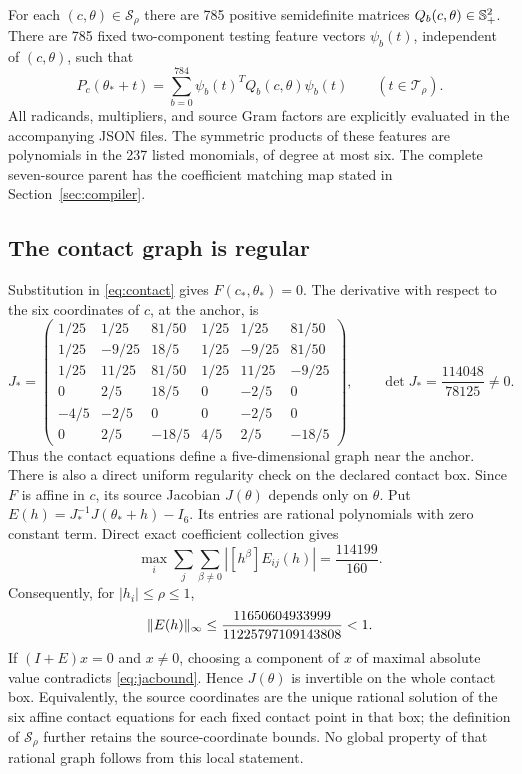 \begin{theorem}\label{thm:main}
For each $(c,\theta)\in\mathcal S_\rho$ there are 785 positive semidefinite
matrices $Q_b(c,\theta)\in\mathbb S_+^2$. There are 785 fixed two-component testing
feature vectors $\psi_b(t)$, independent of $(c,\theta)$, such that
\begin{equation}
 P_c(\theta_*+t)=\sum_{b=0}^{784}\psi_b(t)^TQ_b(c,\theta)\psi_b(t)
 \qquad(t\in\mathcal T_\rho).
 \label{eq:main}
\end{equation}
All radicands, multipliers, and source Gram factors are explicitly evaluated in
the accompanying JSON files. The symmetric products of these features are
polynomials in the 237 listed monomials, of degree at most six. The complete
seven-source parent has the coefficient matching map stated in
Section~\ref{sec:compiler}.
\end{theorem}

\subsection{The contact graph is regular}

Substitution in \eqref{eq:contact} gives $F(c_*,\theta_*)=0$. The derivative
with respect to the six coordinates of $c$, at the anchor, is
\begin{equation}
 J_*=
 \begin{pmatrix}
 1/25&1/25&81/50&1/25&1/25&81/50\\
 1/25&-9/25&18/5&1/25&-9/25&81/50\\
 1/25&11/25&81/50&1/25&11/25&-9/25\\
 0&2/5&18/5&0&-2/5&0\\
 -4/5&-2/5&0&0&-2/5&0\\
 0&2/5&-18/5&4/5&2/5&-18/5
 \end{pmatrix},\qquad
 \det J_*=\frac{114048}{78125}\ne0.
 \label{eq:jacobian}
\end{equation}
Thus the contact equations define a five-dimensional graph near the anchor.
There is also a direct uniform regularity check on the declared contact box.
Since $F$ is affine in $c$, its source Jacobian $J(\theta)$ depends only on
$\theta$. Put $E(h)=J_*^{-1}J(\theta_*+h)-I_6$. Its entries are rational
polynomials with zero constant term. Direct exact coefficient collection gives
\begin{equation}
 \max_i\sum_j\sum_{\beta\ne0}|[h^\beta]E_{ij}(h)|
   =\frac{114199}{160}.
 \label{eq:jacnorm}
\end{equation}
Consequently, for $|h_i|\leq\rho\leq1$,
\begin{equation}
 \lVert E(h)\rVert_\infty\leq
 \frac{11650604933999}{11225797109143808}<1.
 \label{eq:jacbound}
\end{equation}
If $(I+E)x=0$ and $x\ne0$, choosing a component of $x$ of maximal absolute
value contradicts \eqref{eq:jacbound}. Hence $J(\theta)$ is invertible on the
whole contact box. Equivalently, the source coordinates are the unique
rational solution of the six affine contact equations for each fixed contact
point in that box; the definition of $\mathcal S_\rho$ further retains the
source-coordinate bounds. No global property of that rational graph follows
from this local statement.

